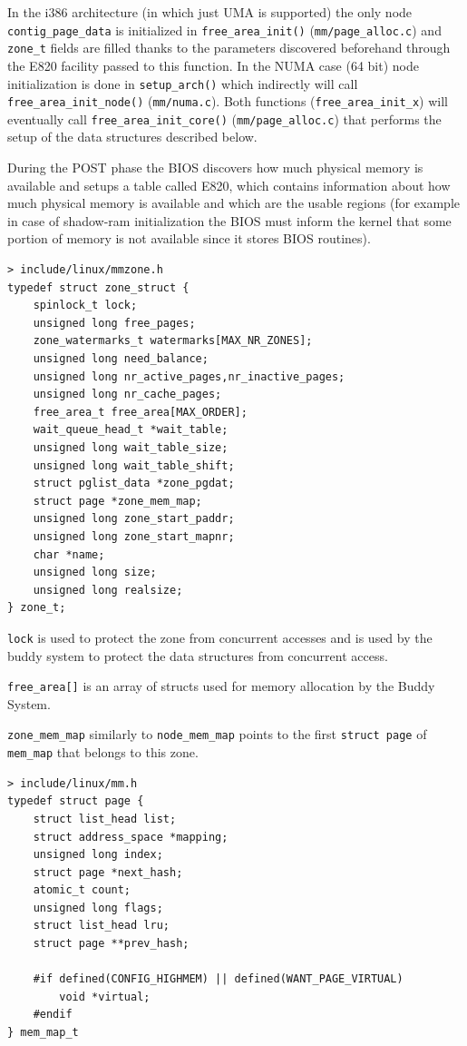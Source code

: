 \documentclass[twoside]{article}
\begin{document}
In the i386 architecture (in which just UMA is supported) the only node
\texttt{contig_page_data} is initialized in \texttt{free_area_init()}
(\texttt{mm/page_alloc.c}) and \texttt{zone_t} fields are filled thanks to the
parameters discovered beforehand through the E820 facility passed to this
function. In the NUMA case (64 bit) node initialization is done in \texttt{setup_arch()} which
indirectly will call \texttt{free_area_init_node()} (\texttt{mm/numa.c}). Both
functions (\texttt{free_area_init_x}) will eventually call
\texttt{free_area_init_core()} (\texttt{mm/page_alloc.c}) that performs the
setup of the data structures described below.

During the POST phase the BIOS discovers how much physical memory is
available and setups a table called E820, which contains information about how
much physical memory is available and which are the usable regions
(for example in case of shadow-ram initialization the BIOS must inform the
kernel that some portion of memory is not available since it stores BIOS
routines).

\newpage

\begin{verbatim}
> include/linux/mmzone.h
typedef struct zone_struct {
    spinlock_t lock;
    unsigned long free_pages;
    zone_watermarks_t watermarks[MAX_NR_ZONES];
    unsigned long need_balance;
    unsigned long nr_active_pages,nr_inactive_pages;
    unsigned long nr_cache_pages;
    free_area_t free_area[MAX_ORDER];
    wait_queue_head_t *wait_table;
    unsigned long wait_table_size;
    unsigned long wait_table_shift;
    struct pglist_data *zone_pgdat;
    struct page *zone_mem_map;
    unsigned long zone_start_paddr;
    unsigned long zone_start_mapnr;
    char *name;
    unsigned long size;
    unsigned long realsize;
} zone_t;
\end{verbatim}

\texttt{lock} is used to protect the zone from concurrent accesses and is used
by the buddy system to protect the data structures from concurrent access.

\texttt{free_area[]} is an array of structs used for memory allocation by the
Buddy System.

\texttt{zone_mem_map} similarly to \texttt{node_mem_map} points to the first
\texttt{struct page} of \texttt{mem_map} that belongs to this zone.

\begin{verbatim}
> include/linux/mm.h
typedef struct page {
    struct list_head list;
    struct address_space *mapping;
    unsigned long index;
    struct page *next_hash;
    atomic_t count;
    unsigned long flags;
    struct list_head lru;
    struct page **prev_hash;

    #if defined(CONFIG_HIGHMEM) || defined(WANT_PAGE_VIRTUAL)
        void *virtual;
    #endif
} mem_map_t
\end{verbatim}
\end{document}
